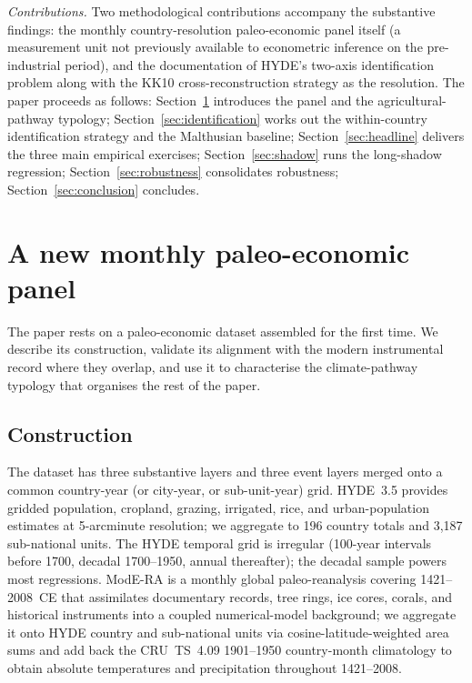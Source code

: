 \documentclass[11pt,letterpaper]{article}
\begin{document}
\emph{Contributions.} Two methodological contributions accompany the substantive findings: the monthly country-resolution paleo-economic panel itself (a measurement unit not previously available to econometric inference on the pre-industrial period), and the documentation of HYDE's two-axis identification problem along with the KK10 cross-reconstruction strategy as the resolution. The paper proceeds as follows: Section~\ref{sec:data} introduces the panel and the agricultural-pathway typology; Section~\ref{sec:identification} works out the within-country identification strategy and the Malthusian baseline; Section~\ref{sec:headline} delivers the three main empirical exercises; Section~\ref{sec:shadow} runs the long-shadow regression; Section~\ref{sec:robustness} consolidates robustness; Section~\ref{sec:conclusion} concludes.

\section{A new monthly paleo-economic panel}
\label{sec:data}

The paper rests on a paleo-economic dataset assembled for the first time. We describe its construction, validate its alignment with the modern instrumental record where they overlap, and use it to characterise the climate-pathway typology that organises the rest of the paper.

\subsection{Construction}

The dataset has three substantive layers and three event layers merged onto a common country-year (or city-year, or sub-unit-year) grid. HYDE~3.5 \citep{goldewijk2017} provides gridded population, cropland, grazing, irrigated, rice, and urban-population estimates at 5-arcminute resolution; we aggregate to 196 country totals and 3{,}187 sub-national units. The HYDE temporal grid is irregular (100-year intervals before 1700, decadal 1700--1950, annual thereafter); the decadal sample powers most regressions. ModE-RA \citep{franke2023modera} is a monthly global paleo-reanalysis covering 1421--2008~CE that assimilates documentary records, tree rings, ice cores, corals, and historical instruments into a coupled numerical-model background; we aggregate it onto HYDE country and sub-national units via cosine-latitude-weighted area sums and add back the CRU~TS~4.09 \citep{harris2020cruts} 1901--1950 country-month climatology to obtain absolute temperatures and precipitation throughout 1421--2008.
\end{document}
